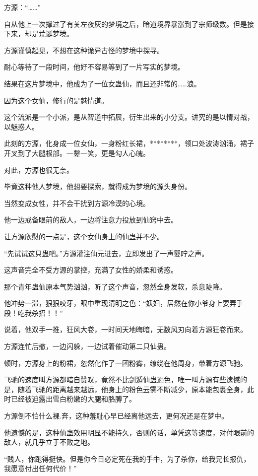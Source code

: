 \begin{this_body}
方源：“……”

自从他上一次撑过了有关左夜灰的梦境之后，暗道境界暴涨到了宗师级数。但是接下来，却是荒诞梦境。

方源谨慎起见，不想在这种诡异古怪的梦境中探寻。

耐心等待了一段时间，他好不容易等到了一片写实的梦境。

结果在这片梦境中，他成为了一位女蛊仙，而且还非常的……浪。

因为这个女仙，修行的是魅情道。

这个流派是一个小派，是从智道中拓展，衍生出来的小分支。讲究的是以情对战，以魅惑人。

此刻的方源，化身成一位女仙，一身粉红长裙，********，领口处波涛汹涌，裙子开叉到了大腿根部。一颦一笑，更是勾人心魄。

对此，方源也很无奈。

毕竟这种他人梦境，他想要探索，就得成为梦境的源头身份。

当然变成女性，并不会干扰到方源冷漠的心境。

他一边戒备眼前的敌人，一边将注意力投放到仙窍中去。

让方源欣慰的一点是，这个女仙身上的仙蛊并不少。

“先试试这只蛊吧。”方源灌注仙元进去，立即发出了一声婴咛之声。

这声音完全不受方源的掌控，充满了女性的娇柔和诱惑。

那个青年蛊仙原本气势汹汹，听了这个声音，忽然全身发软，杀意陡降。

他冲势一滞，狠狠咬牙，眼中重现清明之色：“妖妇，居然在你小爷身上耍弄手段！吃我杀招！！”

说着，他双手一推，狂风大卷，一时间天地晦暗，无数风刃向着方源狂卷而来。

方源连忙后撤，一边闪躲，一边试着催动第二只仙蛊。

顿时，方源身上的粉裙，忽然化作了一团粉雾，缭绕在他周身，带着方源飞驰。

飞驰的速度叫方源都暗自赞叹，竟然不比剑遁仙蛊逊色，唯一叫方源有些遗憾的是，随着飞驰的距离越来越远，他身上的粉色云雾不断减少，原本能包裹全身，此时已经被迫露出雪白粉嫩的大腿和胳膊了。

方源倒不怕什么裸.奔，这种羞耻心早已经离他远去，更何况还是在梦中。

他遗憾的是，这种仙蛊效用明显不能持久，否则的话，单凭这等速度，对付眼前的敌人，就几乎立于不败之地。

“贱人，你跑得挺快。但是你今日必定死在我的手中，为了杀你，给我兄长报仇，我愿意付出任何代价！”


\end{this_body}

